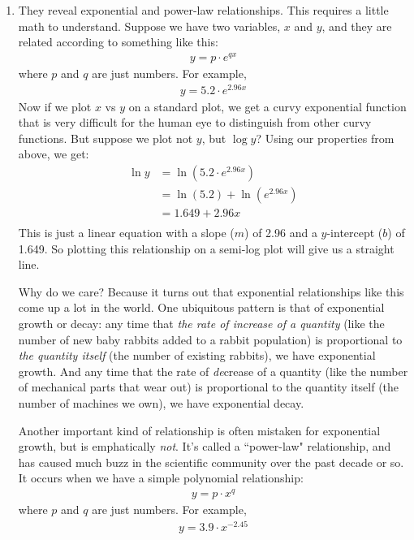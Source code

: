 \documentclass[12pt]{article}
\begin{document}
\begin{enumerate}
In this example, you can easily see from the semi-log plot that event A was a
bigger windfall for investors than event B.

\item They reveal exponential and power-law relationships. This requires a
little math to understand. Suppose we have two variables, $x$ and $y$, and
they are related according to something like this:
\begin{align*}
y = p \cdot e^{qx}
\end{align*}
where $p$ and $q$ are just numbers. For example,
\begin{align*}
y = 5.2 \cdot e^{2.96 x}
\end{align*}
Now if we plot $x$ vs $y$ on a standard plot, we get a curvy exponential
function that is very difficult for the human eye to distinguish from other
curvy functions. But suppose we plot not $y$, but $\log y$? Using our
properties from above, we get:
\small
\begin{align*}
\ln y &= \ln (5.2 \cdot e^{2.96 x}) \\
&= \ln(5.2) + \ln(e^{2.96 x}) \\
&= 1.649 + 2.96 x \\
\end{align*}
This is just a linear equation with a slope ($m$) of 2.96 and a $y$-intercept
($b$) of 1.649. So plotting this relationship on a semi-log plot will give us
a straight line.

Why do we care? Because it turns out that exponential relationships like this
come up a lot in the world. One ubiquitous pattern is that of exponential
growth or decay: any time that \textit{the rate of increase of a quantity}
(like the number of new baby rabbits added to a rabbit population) is
proportional to \textit{the quantity itself} (the number of existing rabbits),
we have exponential growth. And any time that the rate of \textit{de}crease of
a quantity (like the number of mechanical parts that wear out) is proportional
to the quantity itself (the number of machines we own), we have exponential
decay.

Another important kind of relationship is often mistaken for exponential
growth, but is emphatically \textit{not}. It's called a ``power-law"
relationship, and has caused much buzz in the scientific community over the
past decade or so. It occurs when we have a simple polynomial relationship:
\begin{align*}
y = p \cdot x^{q}
\end{align*}
where $p$ and $q$ are just numbers. For example,
\begin{align*}
y = 3.9 \cdot x^{-2.45}
\end{align*}


\end{enumerate}
\end{document}
